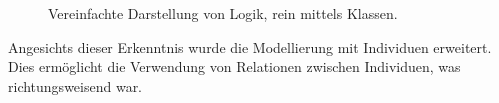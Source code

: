 \begin{figure}[H]
\centering {}
\caption{Vereinfachte Darstellung von Logik, rein mittels Klassen.\label{fig:prolog_logik_baum}\protect\footnotemark}
\end{figure}

\newpage

Angesichts dieser Erkenntnis wurde die Modellierung mit Individuen erweitert. Dies ermöglicht die Verwendung von Relationen zwischen Individuen, was richtungsweisend war.

